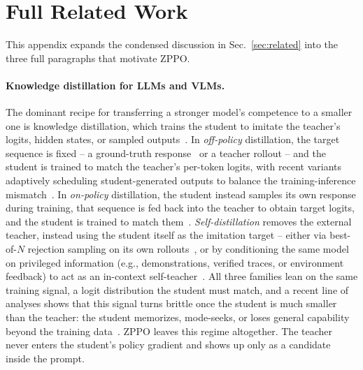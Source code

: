 \section{Full Related Work}
\label{sec:related_full}

This appendix expands the condensed discussion in Sec.~\ref{sec:related} into the three full paragraphs that motivate ZPPO.

\paragraph{Knowledge distillation for LLMs and VLMs.}
The dominant recipe for transferring a stronger model's competence to a smaller one is knowledge distillation, which trains the student to imitate the teacher's logits, hidden states, or sampled outputs~\citep{gou2021knowledge}. In \emph{off-policy} distillation, the target sequence is fixed -- a ground-truth response~\citep{hinton2015distilling,sanh2019distilbert} or a teacher rollout -- and the student is trained to match the teacher's per-token logits, with recent variants adaptively scheduling student-generated outputs to balance the training-inference mismatch~\citep{ko2024distillm}. In \emph{on-policy} distillation, the student instead samples its own response during training, that sequence is fed back into the teacher to obtain target logits, and the student is trained to match them~\citep{gu2024minillm,agarwal2024policy,lu2025onpolicydistillation,fu2026revisiting,bousselham2025vold,yang2026learning,zhang2026fast,wu2026lightning}. \emph{Self-distillation} removes the external teacher, instead using the student itself as the imitation target -- either via best-of-$N$ rejection sampling on its own rollouts~\citep{zelikman2022star,singh2023beyond}, or by conditioning the same model on privileged information (e.g., demonstrations, verified traces, or environment feedback) to act as an in-context self-teacher~\citep{shenfeld2026self,zhao2026self,hubotter2026reinforcement,yang2026self,kim2026does}. All three families lean on the same training signal, a logit distribution the student must match, and a recent line of analyses shows that this signal turns brittle once the student is much smaller than the teacher: the student memorizes, mode-seeks, or loses general capability beyond the training data~\citep{kim2026does,li2026rethinking,song2026survey}. ZPPO leaves this regime altogether. The teacher never enters the student's policy gradient and shows up only as a candidate inside the prompt.

